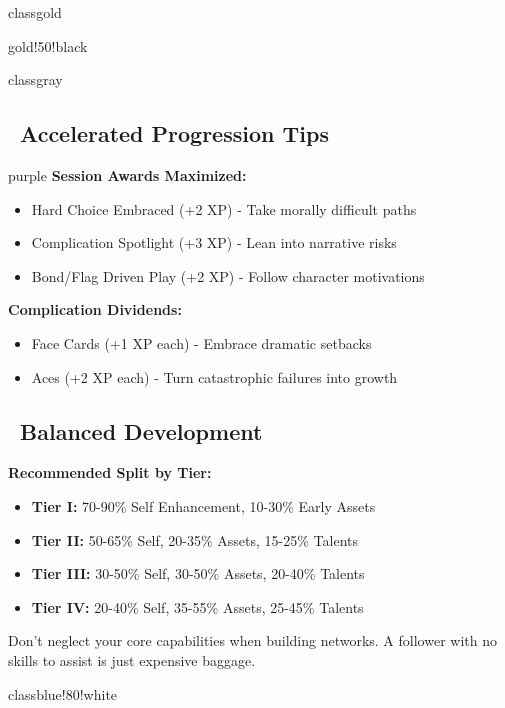 \documentclass[11pt]{article}
\begin{document}
\begin{classguide}{classgold}
\begin{tierbox}{gold!50!black}
\begin{classguide}{classgray}
\subsection*{\faRocket\ Accelerated Progression Tips}

\begin{tierbox}{purple}
\textbf{Session Awards Maximized:}
\begin{itemize}
    \item Hard Choice Embraced (+2 XP) - Take morally difficult paths
    \item Complication Spotlight (+3 XP) - Lean into narrative risks
    \item Bond/Flag Driven Play (+2 XP) - Follow character motivations
\end{itemize}

\textbf{Complication Dividends:}
\begin{itemize}
    \item Face Cards (+1 XP each) - Embrace dramatic setbacks
    \item Aces (+2 XP each) - Turn catastrophic failures into growth
\end{itemize}
\end{tierbox}

\subsection*{\faBalanceScale\ Balanced Development}

\textbf{Recommended Split by Tier:}
\begin{itemize}
    \item \textbf{Tier I:} 70-90\% Self Enhancement, 10-30\% Early Assets
    \item \textbf{Tier II:} 50-65\% Self, 20-35\% Assets, 15-25\% Talents
    \item \textbf{Tier III:} 30-50\% Self, 30-50\% Assets, 20-40\% Talents
    \item \textbf{Tier IV:} 20-40\% Self, 35-55\% Assets, 25-45\% Talents
\end{itemize}

\begin{tipbox}
Don't neglect your core capabilities when building networks. A follower with no skills to assist is just expensive baggage.
\end{tipbox}
\end{classguide}

\newpage

\begin{classguide}{classblue!80!white}

\end{classguide}
\end{tierbox}
\end{classguide}
\end{document}
